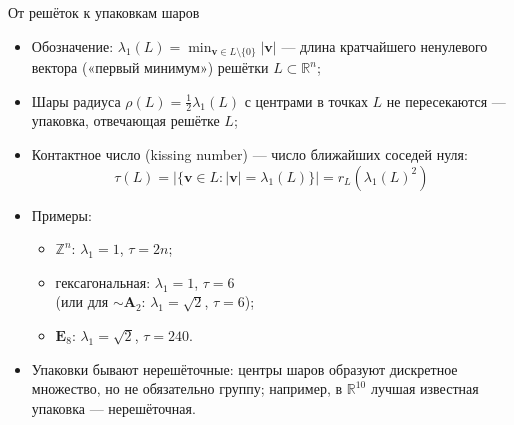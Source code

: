\documentclass[serif, aspectratio=169]{beamer}
\begin{document}
\begin{frame}{От решёток к упаковкам шаров}
    \begin{itemize}
        \item Обозначение: $\lambda_1(L)=\min_{\mathbf{v}\in L\setminus\{0\}}|\mathbf{v}|$ --- длина кратчайшего ненулевого вектора («первый минимум») решётки $L\subset\mathbb{R}^n$;
        \item Шары радиуса $\rho(L) = \tfrac12\lambda_1(L)$ с центрами в точках $L$ не пересекаются --- упаковка, отвечающая решётке $L$;
        \item Контактное число (kissing number) --- число ближайших соседей нуля:
        \[\tau(L) = \big|\{\mathbf{v}\in L : |\mathbf{v}|=\lambda_1(L)\}\big| = r_L(\lambda_1(L)^2)\]
        \item Примеры: 
        \begin{itemize}
        \item $\mathbb{Z}^n$: $\lambda_1=1$, $\tau=2n$;
        \item гексагональная: $\lambda_1=1$, $\tau=6$\\
        (или для $\sim\mathbf{A}_2$: $\lambda_1=\sqrt2$, $\tau=6$);
        \item $\mathbf{E}_8$: $\lambda_1=\sqrt2$, $\tau=240$.
        \end{itemize}
        \item Упаковки бывают нерешёточные: центры шаров образуют дискретное множество, но не обязательно группу; например, в $\mathbb{R}^{10}$ лучшая известная упаковка --- нерешёточная.
    \end{itemize}
\end{frame}
\end{document}
